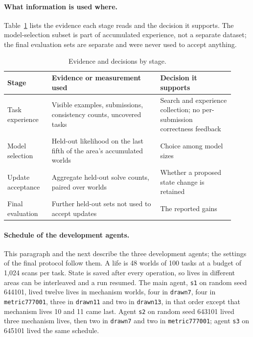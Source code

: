 \documentclass[11pt]{article}
\begin{document}
\paragraph{What information is used where.} Table~\ref{tab:evidence} lists the evidence each stage reads and the decision it supports. The model-selection subset is part of accumulated experience, not a separate dataset; the final evaluation sets are separate and were never used to accept anything.

\begin{table}[h]
\centering
\caption{Evidence and decisions by stage.}
\label{tab:evidence}
\small
\begin{tabular}{p{0.18\linewidth}p{0.44\linewidth}p{0.3\linewidth}}
\toprule
Stage & Evidence or measurement used & Decision it supports \\
\midrule
Task experience & Visible examples, submissions, consistency counts, uncovered tasks & Search and experience collection; no per-submission correctness feedback \\
Model selection & Held-out likelihood on the last fifth of the area's accumulated worlds & Choice among model sizes \\
Update acceptance & Aggregate held-out solve counts, paired over worlds & Whether a proposed state change is retained \\
Final evaluation & Further held-out sets not used to accept updates & The reported gains \\
\bottomrule
\end{tabular}
\end{table}

\paragraph{Schedule of the development agents.} This paragraph and the next describe the three development agents; the settings of the final protocol follow them. A life is 48 worlds of 100 tasks at a budget of 1,024 scans per task. State is saved after every operation, so lives in different areas can be interleaved and a run resumed. The main agent, \texttt{s1} on random seed 644101, lived twelve lives in mechanism worlds, four in \texttt{drawn7}, four in \texttt{metric777001}, three in \texttt{drawn11} and two in \texttt{drawn13}, in that order except that mechanism lives 10 and 11 came last. Agent \texttt{s2} on random seed 643101 lived three mechanism lives, then two in \texttt{drawn7} and two in \texttt{metric777001}; agent \texttt{s3} on 645101 lived the same schedule.
\end{document}
